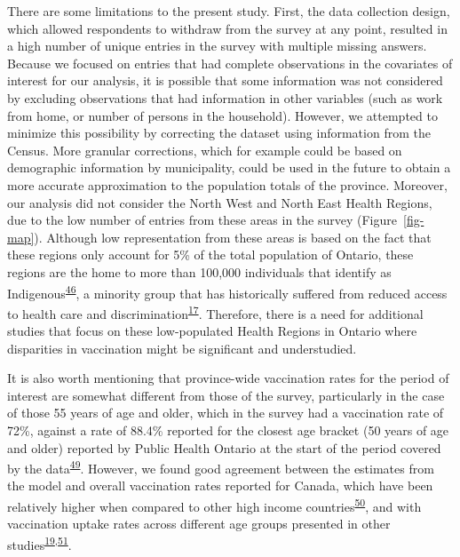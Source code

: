\documentclass[
  letterpaper,
  DIV=11,
  numbers=noendperiod]{scrartcl}
\begin{document}
There are some limitations to the present study. First, the data
collection design, which allowed respondents to withdraw from the survey
at any point, resulted in a high number of unique entries in the survey
with multiple missing answers. Because we focused on entries that had
complete observations in the covariates of interest for our analysis, it
is possible that some information was not considered by excluding
observations that had information in other variables (such as work from
home, or number of persons in the household). However, we attempted to
minimize this possibility by correcting the dataset using information
from the Census. More granular corrections, which for example could be
based on demographic information by municipality, could be used in the
future to obtain a more accurate approximation to the population totals
of the province. Moreover, our analysis did not consider the North West
and North East Health Regions, due to the low number of entries from
these areas in the survey (Figure~\ref{fig-map}). Although low
representation from these areas is based on the fact that these regions
only account for 5\% of the total population of Ontario, these regions
are the home to more than 100,000 individuals that identify as
Indigenous\textsuperscript{\protect\hyperlink{ref-ontariohealth}{46}}, a
minority group that has historically suffered from reduced access to
health care and
discrimination\textsuperscript{\protect\hyperlink{ref-mosby2021}{17}}.
Therefore, there is a need for additional studies that focus on these
low-populated Health Regions in Ontario where disparities in vaccination
might be significant and understudied.

It is also worth mentioning that province-wide vaccination rates for the
period of interest are somewhat different from those of the survey,
particularly in the case of those 55 years of age and older, which in
the survey had a vaccination rate of 72\%, against a rate of 88.4\%
reported for the closest age bracket (50 years of age and older)
reported by Public Health Ontario at the start of the period covered by
the data\textsuperscript{\protect\hyperlink{ref-ontario-covid}{49}}.
However, we found good agreement between the estimates from the model
and overall vaccination rates reported for Canada, which have been
relatively higher when compared to other high income
countries\textsuperscript{\protect\hyperlink{ref-dube2022}{50}}, and
with vaccination uptake rates across different age groups presented in
other
studies\textsuperscript{\protect\hyperlink{ref-guay2022}{19},\protect\hyperlink{ref-macdonald2021}{51}}.
\end{document}

